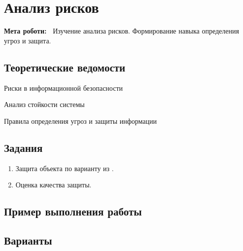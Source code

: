 \chapter{Анализ рисков} \label{chapt8}%
\textbf{Мета роботи:~}%
Изучение анализа рисков. Формирование навыка определения угроз и защита.
\section{Теоретические ведомости} \label{sect7_a}
Риски в информационной безопасности

Анализ стойкости системы

Правила определения угроз и защиты информации
\section{Задания}\label{sect7_b}
%
\begin{enumerate}
  \item Защита объекта по варианту из .
  \item Оценка качества защиты.
\end{enumerate}
\section{Пример выполнения работы}\label{sect7_c}
%
\section{Варианты}\label{sect7_d}
%
